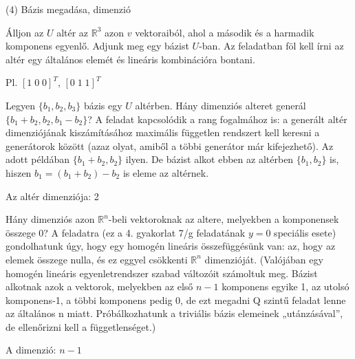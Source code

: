 \begin{frame}[plain]
\begin{tcolorbox}[center, colback={myyellow}, coltext={black}, colframe={myyellow}]
    {\RHuge  (4) Bázis megadása, dimenzió}
    \mmedskip
\end{tcolorbox}
\end{frame}


\begin{frame}
  \begin{tcolorbox}[title={4/1. {\symknight}}]
      Álljon az $U$ altér az $\mathbb{R}^3$ azon $v$ vektoraiból, ahol a második és a harmadik komponens egyenlő. Adjunk meg egy bázist $U$-ban.
  \tcblower
    Az feladatban föl kell írni az altér egy általános elemét és lineáris kombinációra bontani.\\
    \mmedskip 
    
    Pl. $[1 \; 0 \; 0]^T$, $[0 \; 1 \; 1]^T$
  \end{tcolorbox}
\end{frame}


\begin{frame}
  \begin{tcolorbox}[title={4/2. {\symknight}}]
      Legyen $\{b_1,b_2,b_3\}$ bázis egy $U$ altérben. Hány dimenziós alteret generál $\{b_1 + b_2,b_2,b_1 -b_2\}$?
  \tcblower
    A feladat kapcsolódik a rang fogalmához is: a generált altér dimenziójának kiszámításához maximális független rendszert kell keresni a generátorok között (azaz olyat, amiből a többi generátor már kifejezhető). Az adott példában $\{b_1 + b_2,b_2\}$ ilyen. De bázist alkot ebben az altérben $\{b_1,b_2\}$ is, hiszen $b_1 = (b_1 + b_2) - b_2$ is eleme az altérnek.\\
    \mmedskip 
    
    Az altér dimenziója: 2
  \end{tcolorbox}
\end{frame}


\begin{frame}
  \begin{tcolorbox}[title={4/3. {\symrook}}]
      Hány dimenziós azon $\mathbb{R}^n$-beli vektoroknak az altere, melyekben a komponensek összege $0$?
  \tcblower
    A feladatra (ez a 4. gyakorlat 7/g feladatának $y = 0$ speciális esete) gondolhatunk úgy, hogy egy homogén lineáris összefüggésünk van: az, hogy az elemek összege nulla, és ez eggyel csökkenti $\mathbb{R}^n$ dimenzióját. (Valójában egy homogén lineáris egyenletrendszer szabad változóit számoltuk meg. Bázist alkotnak azok a vektorok, melyekben az első $n-1$ komponens egyike 1, az utolsó komponens-1, a többi komponens pedig 0, de ezt megadni Q szintű feladat lenne az általános n miatt. Próbálkozhatunk a triviális bázis elemeinek „utánzásával”, de ellenőrizni kell a függetlenséget.)\\
    \mmedskip 
    
    A dimenzió: $n-1$
  \end{tcolorbox}
\end{frame}


